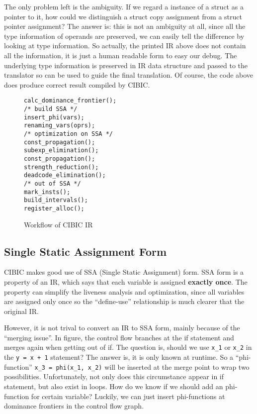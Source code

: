 \documentclass[10pt, a4paper]{article}
\begin{document}
\begin{enumerate}
    The only problem left is the ambiguity. If we regard a instance of a struct
    as a pointer to it, how could we distinguish a struct copy assignment from
    a struct pointer assignment? The answer is: this is not an ambiguity at
    all, since all the type information of operands are preserved, we can
    easily tell the difference by looking at type information. So actually, the
    printed IR above does not contain all the information, it is just a human
    readable form to easy our debug. The underlying type information is
    preserved in IR data structure and passed to the translator so can be used
    to guide the final translation. Of course, the code above does produce
    correct result compiled by CIBIC.
\end{enumerate}

\begin{figure}[H]
    \centering
    \begin{verbatim}
calc_dominance_frontier();
/* build SSA */
insert_phi(vars);
renaming_vars(oprs);
/* optimization on SSA */
const_propagation();
subexp_elimination();
const_propagation();
strength_reduction();
deadcode_elimination();
/* out of SSA */
mark_insts();
build_intervals();
register_alloc();
    \end{verbatim}
    \caption{Workflow of CIBIC IR}
\end{figure}

\subsection{Single Static Assignment Form}
CIBIC makes good use of SSA (Single Static Assignment) form. SSA form is a
property of an IR, which says that each variable is assigned \textbf{exactly
once}. The property can simplify the liveness analysis and optimization, since
all variables are assigned only once so the ``define-use'' relationship is much
clearer that the original IR.

However, it is not trival to convert an IR to SSA form, mainly because of the
``merging issue''. In figure, the control flow branches at the if statement and
merges again when getting out of if. The question is, should we use
\texttt{x\_1} or \texttt{x\_2} in the \texttt{y = x + 1} statement? The answer
is, it is only known at runtime. So a ``phi-function'' \texttt{x\_3 = phi(x\_1,
x\_2)} will be inserted at the merge point to wrap two possibilities.
Unfortunately, not only does this circumstance appear in if statement, but also
exist in loops. How do we know if we should add an phi-function for certain
variable? Luckily, we can just insert phi-functions at dominance frontiers in
the control flow graph.
\end{document}
